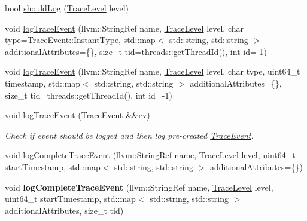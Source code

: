 \begin{DoxyCompactItemize}
bool \hyperlink{classglow_1_1_trace_context_a9b38e028fc617b1dd53e9c11c01ca506}{should\+Log} (\hyperlink{structglow_1_1_trace_event_a10132a384d74408a112510cbe1b7d978}{Trace\+Level} level)
\item 
void \hyperlink{classglow_1_1_trace_context_ac3d59447d63663657a5c31f46d817d06}{log\+Trace\+Event} (llvm\+::\+String\+Ref name, \hyperlink{structglow_1_1_trace_event_a10132a384d74408a112510cbe1b7d978}{Trace\+Level} level, char type=Trace\+Event\+::\+Instant\+Type, std\+::map$<$ std\+::string, std\+::string $>$ additional\+Attributes=\{\}, size\+\_\+t tid=threads\+::get\+Thread\+Id(), int id=-\/1)
\item 
void \hyperlink{classglow_1_1_trace_context_aa08041f9fb3daf7e095b1806af87d779}{log\+Trace\+Event} (llvm\+::\+String\+Ref name, \hyperlink{structglow_1_1_trace_event_a10132a384d74408a112510cbe1b7d978}{Trace\+Level} level, char type, uint64\+\_\+t timestamp, std\+::map$<$ std\+::string, std\+::string $>$ additional\+Attributes=\{\}, size\+\_\+t tid=threads\+::get\+Thread\+Id(), int id=-\/1)
\item 
\mbox{\label{classglow_1_1_trace_context_aa3df5c08fa1c8c16ab0a51eaaaf850e5}} 
void \hyperlink{classglow_1_1_trace_context_aa3df5c08fa1c8c16ab0a51eaaaf850e5}{log\+Trace\+Event} (\hyperlink{structglow_1_1_trace_event}{Trace\+Event} \&\&ev)
\begin{DoxyCompactList}\small\item\em Check if event should be logged and then log pre-\/created \hyperlink{structglow_1_1_trace_event}{Trace\+Event}. \end{DoxyCompactList}\item 
void \hyperlink{classglow_1_1_trace_context_aac75f25ff3479645e161d5c13c34ff34}{log\+Complete\+Trace\+Event} (llvm\+::\+String\+Ref name, \hyperlink{structglow_1_1_trace_event_a10132a384d74408a112510cbe1b7d978}{Trace\+Level} level, uint64\+\_\+t start\+Timestamp, std\+::map$<$ std\+::string, std\+::string $>$ additional\+Attributes=\{\})
\item 
\mbox{\label{classglow_1_1_trace_context_a28d1e54f379674d087afd75fd1082cdc}} 
void {\bfseries log\+Complete\+Trace\+Event} (llvm\+::\+String\+Ref name, \hyperlink{structglow_1_1_trace_event_a10132a384d74408a112510cbe1b7d978}{Trace\+Level} level, uint64\+\_\+t start\+Timestamp, std\+::map$<$ std\+::string, std\+::string $>$ additional\+Attributes, size\+\_\+t tid)
\item 

\end{DoxyCompactItemize}
